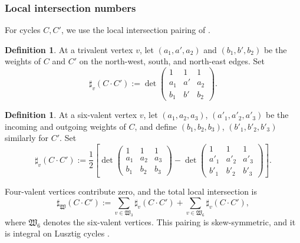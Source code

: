 \documentclass[12pt, reqno]{amsart}
\theoremstyle{plain}
\theoremstyle{definition}
\newtheorem{definition}[theorem]{Definition}
\numberwithin{equation}{section}
\begin{document}
\subsubsection{Local intersection numbers}

For cycles \(C,C'\), we use the local intersection pairing of
\cite[Definitions~4.17, 4.18, and~4.23]{casals2025cluster}.

\begin{definition}\label{def:local-intersection-trivalent}
    At a trivalent vertex \(v\), let \((a_1,a',a_2)\) and
    \((b_1,b',b_2)\) be the weights of \(C\) and \(C'\) on the
    north-west, south, and north-east edges. Set
    \begin{equation}\label{eq:local-intersection-trivalent}
        \sharp_v(C\mathbin{\cdot}C')
        :=\det
        \begin{pmatrix}
            1&1&1\\
            a_1&a'&a_2\\
            b_1&b'&b_2
        \end{pmatrix}.
    \end{equation}
\end{definition}

\begin{definition}\label{def:local-intersection-six-valent}
    At a six-valent vertex \(v\), let
    \((a_1,a_2,a_3)\), \((a'_1,a'_2,a'_3)\) be the incoming and
    outgoing weights of \(C\), and define
    \((b_1,b_2,b_3)\), \((b'_1,b'_2,b'_3)\) similarly for \(C'\).
    Set
    \begin{equation}\label{eq:local-intersection-six-valent}
        \sharp_v(C\mathbin{\cdot}C')
        :=\frac12\left[
        \det\begin{pmatrix}
            1&1&1\\
            a_1&a_2&a_3\\
            b_1&b_2&b_3
        \end{pmatrix}
        -
        \det\begin{pmatrix}
            1&1&1\\
            a'_1&a'_2&a'_3\\
            b'_1&b'_2&b'_3
        \end{pmatrix}
        \right].
    \end{equation}
\end{definition}

Four-valent vertices contribute zero, and the total local intersection is
\begin{equation}\label{eq:total-local-intersection}
    \sharp_{\mathfrak W}(C\mathbin{\cdot}C')
    :=\sum_{v\in\mathfrak W_3}
      \sharp_v(C\mathbin{\cdot}C')
      +\sum_{v\in\mathfrak W_6}
      \sharp_v(C\mathbin{\cdot}C'),
\end{equation}
where \(\mathfrak W_6\) denotes the six-valent vertices. This pairing
is skew-symmetric, and it is integral on Lusztig cycles
\cite[Remark~4.22]{casals2025cluster}.
\end{document}
